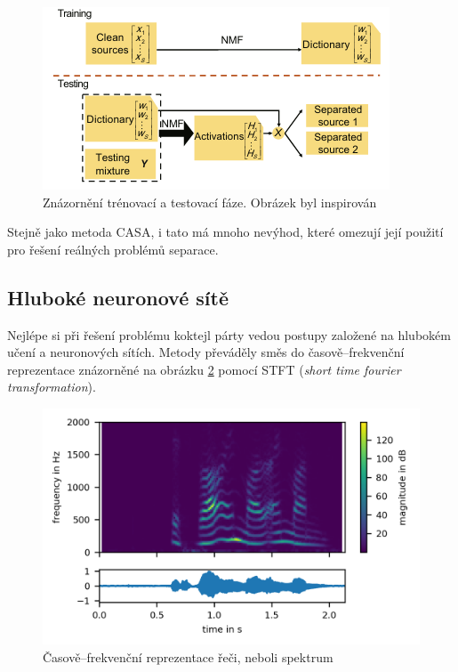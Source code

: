 \begin{figure}[H]
    \centering
    \includegraphics[scale=0.6]{obrazky-figures/nmf.png}
    \caption{\label{fig:nmf}Znázornění trénovací a testovací fáze. Obrázek byl inspirován~\cite{speechseparation}}
\end{figure}

Stejně jako metoda CASA, i tato má mnoho nevýhod, které omezují její použití pro řešení reálných problémů separace.



\subsection{Hluboké neuronové sítě}
Nejlépe si při řešení problému koktejl párty vedou postupy založené na hlubokém učení a neuronových sítích.
Metody převáděly směs do časově--frekvenční reprezentace znázorněné na obrázku \ref{fig:spektrum} pomocí STFT (\textit{short time fourier transformation}).


\begin{figure}[H]
    \centering
    \includegraphics[scale=0.6]{obrazky-figures/spektrum.png}
    \caption{\label{fig:spektrum}Časově--frekvenční reprezentace řeči, neboli spektrum}
\end{figure}



